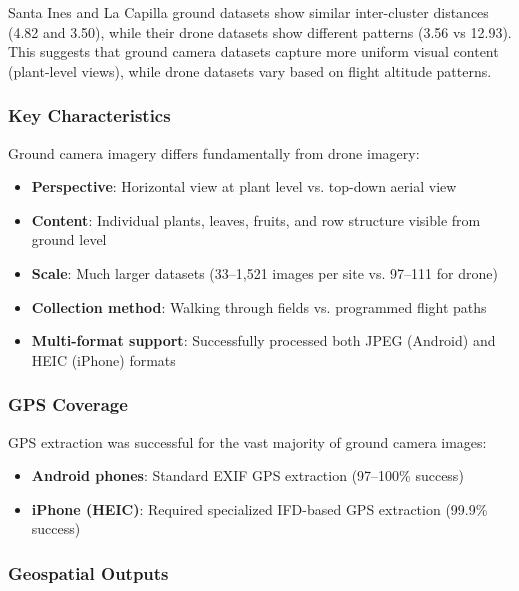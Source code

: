 Santa Ines and La Capilla ground datasets show similar inter-cluster distances (4.82 and 3.50), while their drone datasets show different patterns (3.56 vs 12.93). This suggests that ground camera datasets capture more uniform visual content (plant-level views), while drone datasets vary based on flight altitude patterns.

\subsubsection{Key Characteristics}

Ground camera imagery differs fundamentally from drone imagery:

\begin{itemize}
    \item \textbf{Perspective}: Horizontal view at plant level vs. top-down aerial view
    \item \textbf{Content}: Individual plants, leaves, fruits, and row structure visible from ground level
    \item \textbf{Scale}: Much larger datasets (33--1,521 images per site vs. 97--111 for drone)
    \item \textbf{Collection method}: Walking through fields vs. programmed flight paths
    \item \textbf{Multi-format support}: Successfully processed both JPEG (Android) and HEIC (iPhone) formats
\end{itemize}


\subsubsection{GPS Coverage}

GPS extraction was successful for the vast majority of ground camera images:

\begin{itemize}
    \item \textbf{Android phones}: Standard EXIF GPS extraction (97--100\% success)
    \item \textbf{iPhone (HEIC)}: Required specialized IFD-based GPS extraction (99.9\% success)
\end{itemize}

\subsubsection{Geospatial Outputs}

